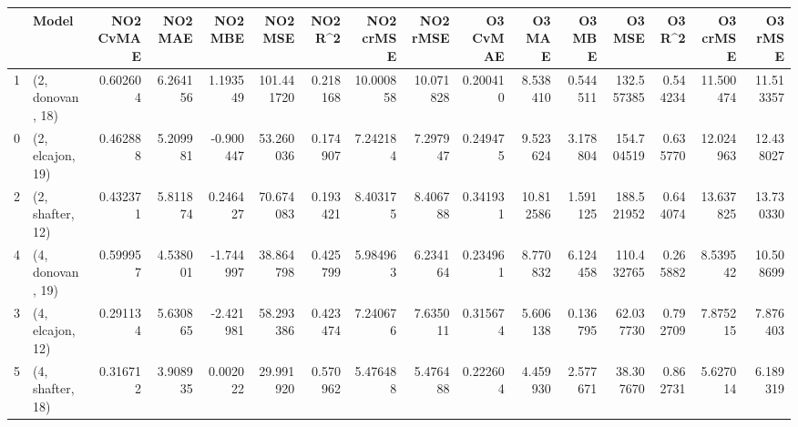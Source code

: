 \begin{tabular}{llrrrrrrrrrrrrrr}
\toprule
{} &             Model &  NO2 CvMAE &   NO2 MAE &   NO2 MBE &     NO2 MSE &   NO2 R\textasciicircum2 &  NO2 crMSE &   NO2 rMSE &  O3 CvMAE &     O3 MAE &    O3 MBE &      O3 MSE &    O3 R\textasciicircum2 &   O3 crMSE &    O3 rMSE \\
\midrule
1 &  (2, donovan, 18) &   0.602604 &  6.264156 &  1.193549 &  101.441720 &  0.218168 &  10.000858 &  10.071828 &  0.200410 &   8.538410 &  0.544511 &  132.557385 &  0.544234 &  11.500474 &  11.513357 \\
0 &  (2, elcajon, 19) &   0.462888 &  5.209981 & -0.900447 &   53.260036 &  0.174907 &   7.242184 &   7.297947 &  0.249475 &   9.523624 &  3.178804 &  154.704519 &  0.635770 &  12.024963 &  12.438027 \\
2 &  (2, shafter, 12) &   0.432371 &  5.811874 &  0.246427 &   70.674083 &  0.193421 &   8.403175 &   8.406788 &  0.341931 &  10.812586 &  1.591125 &  188.521952 &  0.644074 &  13.637825 &  13.730330 \\
4 &  (4, donovan, 19) &   0.599957 &  4.538001 & -1.744997 &   38.864798 &  0.425799 &   5.984963 &   6.234164 &  0.234961 &   8.770832 &  6.124458 &  110.432765 &  0.265882 &   8.539542 &  10.508699 \\
3 &  (4, elcajon, 12) &   0.291134 &  5.630865 & -2.421981 &   58.293386 &  0.423474 &   7.240676 &   7.635011 &  0.315674 &   5.606138 &  0.136795 &   62.037730 &  0.792709 &   7.875215 &   7.876403 \\
5 &  (4, shafter, 18) &   0.316712 &  3.908935 &  0.002022 &   29.991920 &  0.570962 &   5.476488 &   5.476488 &  0.222604 &   4.459930 &  2.577671 &   38.307670 &  0.862731 &   5.627014 &   6.189319 \\
\bottomrule
\end{tabular}

